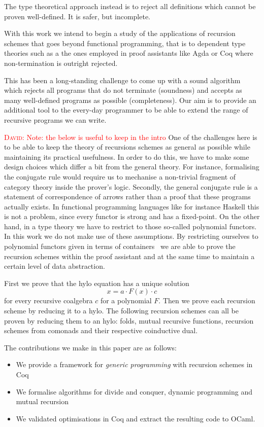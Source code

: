 \documentclass[a4paper, UKenglish, cleveref, autoref, thm-restate]{lipics-v2021}
\newcommand{\dcas}[1]{\textcolor{red}{\textsc{David}: #1}}
\newcommand{\comp}{\cdot}
\begin{document}
The type theoretical approach instead is to reject all definitions which cannot
be proven well-defined. It is safer, but incomplete.

With this work we intend to begin a study of the applications of recursion
schemes that goes beyond functional programming, that is to dependent type
theories such as a the ones employed in proof assistants like Agda or Coq where
non-termination is outright rejected.

This has been a long-standing challenge to come up with a sound algorithm which
rejects all programs that do not terminate (soundness) and accepts as many
well-defined programs as possible (completeness). Our aim is to provide an
additional tool to the every-day programmer to be able to extend the range of
recursive programs we can write.

\dcas{Note: the below is useful to keep in the intro}
One of the challenges here is to be able to keep the theory of recursions
schemes as general as possible while maintaining its practical usefulness. In
order to do this, we have to make some design choices which differ a bit from
the general theory.  For instance, formalising the conjugate rule would require
us to mechanise a non-trivial fragment of category theory inside the prover's
logic.  Secondly, the general conjugate rule is a statement of correspondence of
arrows rather than a proof that these programs actually exists. In functional
programming languages like for instance Haskell this is not a problem, since
every functor is strong and has a fixed-point.  On the other hand, in a type
theory we have to restrict to those so-called polynomial functors. In this work
we do not make use of these assumptions. By restricting ourselves to polynomial
functors given in terms of containers~\cite{AbbottAG05} we are able to prove the
recursion schemes within the proof assistant and at the same time to maintain a
certain level of data abstraction.

First we prove that the hylo equation has a unique solution
\[
  x = a \comp F(x) \comp c
\]
for every recursive coalgebra $c$ for a polynomial $F$. Then we prove each
recursion scheme by reducing it to a hylo. The following recursion schemes can
all be proven by reducing them to an hylo: folds, mutual recursive functions,
recursion schemes from comonads and their respective coinductive dual.

The contributions we make in this paper are as follows:
\begin{itemize}
  \item We provide a framework for \emph{generic programming} with recursion
schemes in Coq
  \item We formalise algorithms for divide and conquer, dynamic programming and
mutual recursion
  \item We validated optimisations in Coq and extract the resulting code to
OCaml.
\end{itemize}
\end{document}
